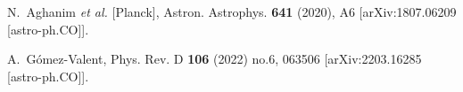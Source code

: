 \documentclass[aps,prl,10pt,twocolumn,superscriptaddress, nofootinbib]{revtex4}
\begin{document}
\begin{thebibliography}{99}
N.~Aghanim \textit{et al.} [Planck],
Astron. Astrophys. \textbf{641} (2020), A6
[arXiv:1807.06209 [astro-ph.CO]].

A.~G\'omez-Valent,
Phys. Rev. D \textbf{106} (2022) no.6, 063506
[arXiv:2203.16285 [astro-ph.CO]].

\end{thebibliography}
\end{document}
